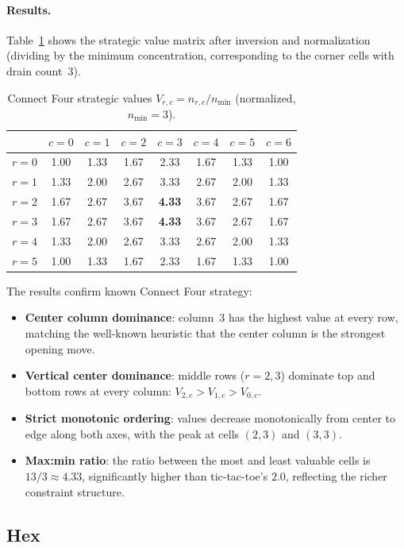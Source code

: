\documentclass[11pt,a4paper]{article}
\begin{document}
\paragraph{Results.}
Table~\ref{tab:c4} shows the strategic value matrix after inversion and normalization (dividing by the minimum concentration, corresponding to the corner cells with drain count~3).

\begin{table}[ht]
\centering
\caption{Connect Four strategic values $V_{r,c} = n_{r,c} / n_{\min}$ (normalized, $n_{\min} = 3$).}
\label{tab:c4}
\begin{tabular}{@{}c|ccccccc@{}}
\toprule
& $c=0$ & $c=1$ & $c=2$ & $c=3$ & $c=4$ & $c=5$ & $c=6$ \\
\midrule
$r=0$ & 1.00 & 1.33 & 1.67 & 2.33 & 1.67 & 1.33 & 1.00 \\
$r=1$ & 1.33 & 2.00 & 2.67 & 3.33 & 2.67 & 2.00 & 1.33 \\
$r=2$ & 1.67 & 2.67 & 3.67 & \textbf{4.33} & 3.67 & 2.67 & 1.67 \\
$r=3$ & 1.67 & 2.67 & 3.67 & \textbf{4.33} & 3.67 & 2.67 & 1.67 \\
$r=4$ & 1.33 & 2.00 & 2.67 & 3.33 & 2.67 & 2.00 & 1.33 \\
$r=5$ & 1.00 & 1.33 & 1.67 & 2.33 & 1.67 & 1.33 & 1.00 \\
\bottomrule
\end{tabular}
\end{table}

The results confirm known Connect Four strategy:
\begin{itemize}
  \item \textbf{Center column dominance}: column~3 has the highest value at every row, matching the well-known heuristic that the center column is the strongest opening move.
  \item \textbf{Vertical center dominance}: middle rows ($r = 2, 3$) dominate top and bottom rows at every column: $V_{2,c} > V_{1,c} > V_{0,c}$.
  \item \textbf{Strict monotonic ordering}: values decrease monotonically from center to edge along both axes, with the peak at cells $(2, 3)$ and $(3, 3)$.
  \item \textbf{Max:min ratio}: the ratio between the most and least valuable cells is $13/3 \approx 4.33$, significantly higher than tic-tac-toe's $2.0$, reflecting the richer constraint structure.
\end{itemize}

\subsection{Hex}
\label{sec:hex}
\end{document}
